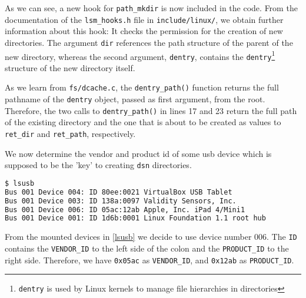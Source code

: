 \documentclass{semdoc}
\begin{document}
As we can see, a new hook for \texttt{path\_mkdir} is now included in the code. 
From the documentation of the \texttt{lsm\_hooks.h} file in \texttt{include/linux/}, we obtain further information about this hook:
It checks the permission for the creation of new directories. 
The argument \texttt{dir} references the path structure of the parent of the new directory, whereas the second argument, \texttt{dentry}, contains the \texttt{dentry}\footnote{\texttt{dentry} is used by Linux kernels to manage file hierarchies in directories} structure of the new directory itself. 

As we learn from \texttt{fs/dcache.c}, the \texttt{dentry\_path()} function returns the full pathname of the \texttt{dentry} object, passed as first argument, from the root. 
Therefore, the two calls to \texttt{dentry\_path()} in lines 17 and 23 return the full path of the existing directory and the one that is about to be created as values to \texttt{ret\_dir} and \texttt{ret\_path}, respectively.


We now determine the vendor and product id of some usb device which is supposed to be the 'key' to creating \texttt{dsn} directories.

\begin{lstlisting}[language=bash, caption={Displaying mounted usb devices using \texttt{lsusb}}, label={lsusb}]
$ lsusb
Bus 001 Device 004: ID 80ee:0021 VirtualBox USB Tablet
Bus 001 Device 003: ID 138a:0097 Validity Sensors, Inc. 
Bus 001 Device 006: ID 05ac:12ab Apple, Inc. iPad 4/Mini1
Bus 001 Device 001: ID 1d6b:0001 Linux Foundation 1.1 root hub
\end{lstlisting}

From the mounted devices in \cref{lsusb} we decide to use device number 006. 
The \texttt{ID} contains the \texttt{VENDOR\_ID} to the left side of the colon and the \texttt{PRODUCT\_ID} to the right side. 
Therefore, we have \texttt{0x05ac} as \texttt{VENDOR\_ID}, and \texttt{0x12ab} as \texttt{PRODUCT\_ID}. 
\end{document}
